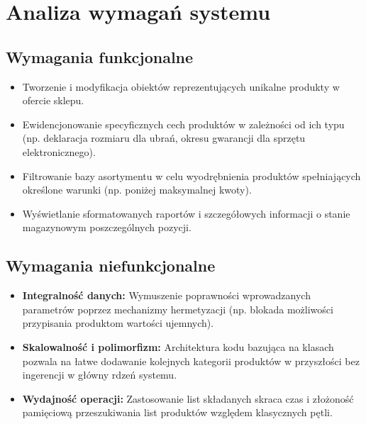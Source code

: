 \newpage
\section{Analiza wymagań systemu}

\subsection*{Wymagania funkcjonalne}
\begin{itemize}
    \item Tworzenie i modyfikacja obiektów reprezentujących unikalne produkty w ofercie sklepu.
    \item Ewidencjonowanie specyficznych cech produktów w zależności od ich typu (np. deklaracja rozmiaru dla ubrań, okresu gwarancji dla sprzętu elektronicznego).
    \item Filtrowanie bazy asortymentu w celu wyodrębnienia produktów spełniających określone warunki (np. poniżej maksymalnej kwoty).
    \item Wyświetlanie sformatowanych raportów i szczegółowych informacji o stanie magazynowym poszczególnych pozycji.
\end{itemize}

\subsection*{Wymagania niefunkcjonalne}
\begin{itemize}
    \item \textbf{Integralność danych:} Wymuszenie poprawności wprowadzanych parametrów poprzez mechanizmy hermetyzacji (np. blokada możliwości przypisania produktom wartości ujemnych).
    \item \textbf{Skalowalność i polimorfizm:} Architektura kodu bazująca na klasach pozwala na łatwe dodawanie kolejnych kategorii produktów w przyszłości bez ingerencji w główny rdzeń systemu.
    \item \textbf{Wydajność operacji:} Zastosowanie list składanych skraca czas i złożoność pamięciową przeszukiwania list produktów względem klasycznych pętli.
\end{itemize}
